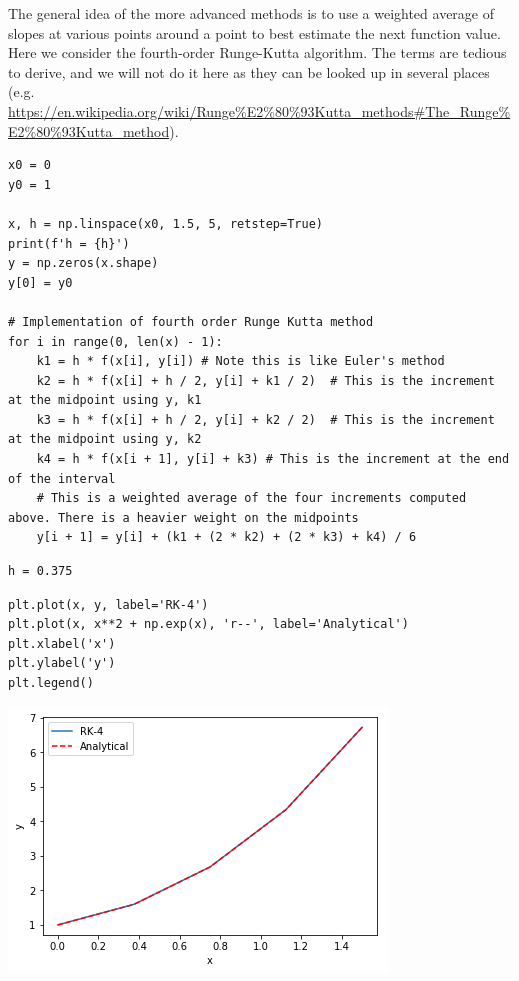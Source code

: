 \documentclass[11pt]{article}
\begin{document}
The general idea of the more advanced methods is to use a weighted average of slopes at various points around a point to best estimate the next function value. Here we consider the fourth-order Runge-Kutta algorithm. The terms are tedious to derive, and we will not do it here as they can be looked up in several places (e.g. \url{https://en.wikipedia.org/wiki/Runge\%E2\%80\%93Kutta\_methods\#The\_Runge\%E2\%80\%93Kutta\_method}).

\begin{verbatim}
x0 = 0
y0 = 1

x, h = np.linspace(x0, 1.5, 5, retstep=True)
print(f'h = {h}')
y = np.zeros(x.shape)
y[0] = y0

# Implementation of fourth order Runge Kutta method
for i in range(0, len(x) - 1):
    k1 = h * f(x[i], y[i]) # Note this is like Euler's method
    k2 = h * f(x[i] + h / 2, y[i] + k1 / 2)  # This is the increment at the midpoint using y, k1
    k3 = h * f(x[i] + h / 2, y[i] + k2 / 2)  # This is the increment at the midpoint using y, k2
    k4 = h * f(x[i + 1], y[i] + k3) # This is the increment at the end of the interval
    # This is a weighted average of the four increments computed above. There is a heavier weight on the midpoints
    y[i + 1] = y[i] + (k1 + (2 * k2) + (2 * k3) + k4) / 6
\end{verbatim}

\begin{verbatim}
h = 0.375

\end{verbatim}

\begin{verbatim}
plt.plot(x, y, label='RK-4')
plt.plot(x, x**2 + np.exp(x), 'r--', label='Analytical')
plt.xlabel('x')
plt.ylabel('y')
plt.legend()
\end{verbatim}

\begin{center}
\includegraphics[width=.9\linewidth]{obipy-resources/744bcb3e58866fd0750c7a1efd9d42e8-68311RCc.png}
\end{center}
\end{document}
